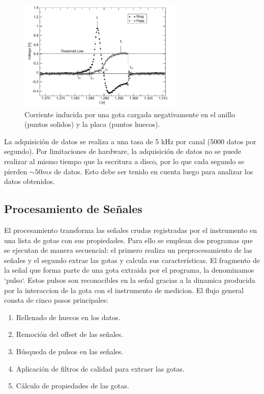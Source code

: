 \documentclass[12pt,a4paper]{article}
\begin{document}
\begin{figure}[!hb]
    \centering
    \includegraphics[width=0.7\textwidth]{figures/corriente_gotas.png}
    \caption{Corriente inducida por una gota cargada negativamente en el anillo (puntos solidos) y la placa (puntos huecos).}
    \label{fig:corriente_gotas}
\end{figure}

La adquisición de datos se realiza a una tasa de 5 kHz por canal (5000 datos por segundo). Por limitaciones de hardware, la adquisición de datos no se puede realizar al mismo tiempo que la escritura a disco, por lo que cada segundo se pierden $\sim 50ms$ de datos. Esto debe ser tenido en cuenta luego para analizar los datos obtenidos.

\subsection{Procesamiento de Señales}
\lhead{}

El procesamiento transforma las señales crudas registradas por el instrumento en una lista de gotas con sus propiedades. Para ello se emplean dos programas que se ejecutan de manera secuencial: el primero realiza un preprocesamiento de las señales y el segundo extrae las gotas y calcula sus características.
El fragmento de la señal que forma parte de una gota extraida por el programa, la denominamos `pulso`. Estos pulsos son reconocibles en la señal gracias a la dinamica producida por la interaccion de la gota con el instrumento de medicion.
El flujo general consta de cinco pasos principales:

\begin{enumerate}
    \item Rellenado de huecos en los datos.
    \item Remoción del offset de las señales.
    \item Búsqueda de pulsos en las señales.
    \item Aplicación de filtros de calidad para extraer las gotas.
    \item Cálculo de propiedades de las gotas.
\end{enumerate}
\end{document}
